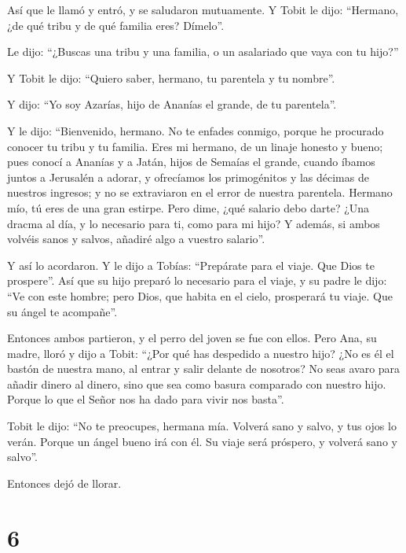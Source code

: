  Así que le llamó y entró, y se saludaron mutuamente.
 Y Tobit le dijo: ``Hermano, ¿de qué tribu y de qué
familia eres? Dímelo''.

 Le dijo: ``¿Buscas una tribu y una familia, o un
asalariado que vaya con tu hijo?''

Y Tobit le dijo: ``Quiero saber, hermano, tu parentela y tu nombre''.

 Y dijo: ``Yo soy Azarías, hijo de Ananías el grande, de
tu parentela''.

 Y le dijo: ``Bienvenido, hermano. No te enfades conmigo,
porque he procurado conocer tu tribu y tu familia. Eres mi hermano, de
un linaje honesto y bueno; pues conocí a Ananías y a Jatán, hijos de
Semaías el grande, cuando íbamos juntos a Jerusalén a adorar, y
ofrecíamos los primogénitos y las décimas de nuestros ingresos; y no se
extraviaron en el error de nuestra parentela. Hermano mío, tú eres de
una gran estirpe.  Pero dime, ¿qué salario debo darte?
¿Una dracma al día, y lo necesario para ti, como para mi hijo?
 Y además, si ambos volvéis sanos y salvos, añadiré algo
a vuestro salario''.

 Y así lo acordaron. Y le dijo a Tobías: ``Prepárate para
el viaje. Que Dios te prospere''. Así que su hijo preparó lo necesario
para el viaje, y su padre le dijo: ``Ve con este hombre; pero Dios, que
habita en el cielo, prosperará tu viaje. Que su ángel te acompañe''.

Entonces ambos partieron, y el perro del joven se fue con ellos.
 Pero Ana, su madre, lloró y dijo a Tobit: ``¿Por qué has
despedido a nuestro hijo? ¿No es él el bastón de nuestra mano, al entrar
y salir delante de nosotros?  No seas avaro para añadir
dinero al dinero, sino que sea como basura comparado con nuestro hijo.
 Porque lo que el Señor nos ha dado para vivir nos
basta''.

 Tobit le dijo: ``No te preocupes, hermana mía. Volverá
sano y salvo, y tus ojos lo verán.  Porque un ángel bueno
irá con él. Su viaje será próspero, y volverá sano y salvo''.

 Entonces dejó de llorar.

\hypertarget{section-5}{%
\section{6}\label{section-5}}

